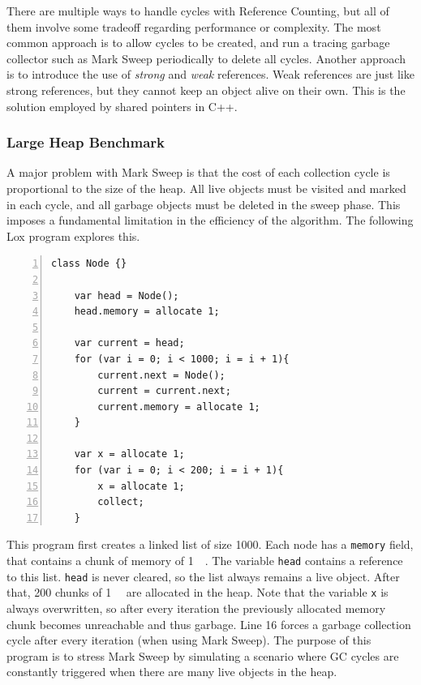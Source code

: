 \documentclass[10pt]{extarticle}
\begin{document}
\medskip
There are multiple ways to handle cycles with Reference Counting, but all of them involve some tradeoff regarding performance or complexity. The most common approach is to allow cycles to be created, and run a tracing garbage collector such as Mark Sweep periodically to delete all cycles. Another approach is to introduce the use of \textit{strong} and \textit{weak} references. Weak references are just like strong references, but they cannot keep an object alive on their own. This is the solution employed by shared pointers in C++.

\subsubsection{Large Heap Benchmark}

A major problem with Mark Sweep is that the cost of each collection cycle is proportional to the size of the heap. All live objects must be visited and marked in each cycle, and all garbage objects must be deleted in the sweep phase. This imposes a fundamental limitation in the efficiency of the algorithm. The following Lox program explores this.

\begin{lstlisting}[numbers=left]
    class Node {}

    var head = Node();
    head.memory = allocate 1;

    var current = head;
    for (var i = 0; i < 1000; i = i + 1){
        current.next = Node();
        current = current.next;
        current.memory = allocate 1;
    }

    var x = allocate 1;
    for (var i = 0; i < 200; i = i + 1){
        x = allocate 1;
        collect;
    }
\end{lstlisting}

This program first creates a linked list of size 1000. Each node has a \lstinline{memory} field, that contains a chunk of memory of \SI{1}{\kilo\byte}. The variable \lstinline{head} contains a reference to this list. \lstinline{head} is never cleared, so the list always remains a live object. After that, 200 chunks of \SI{1}{\kilo\byte} are allocated in the heap. Note that the variable \lstinline{x} is always overwritten, so after every iteration the previously allocated memory chunk becomes unreachable and thus garbage. Line 16 forces a garbage collection cycle after every iteration (when using Mark Sweep). The purpose of this program is to stress Mark Sweep by simulating a scenario where GC cycles are constantly triggered when there are many live objects in the heap. 
\end{document}
